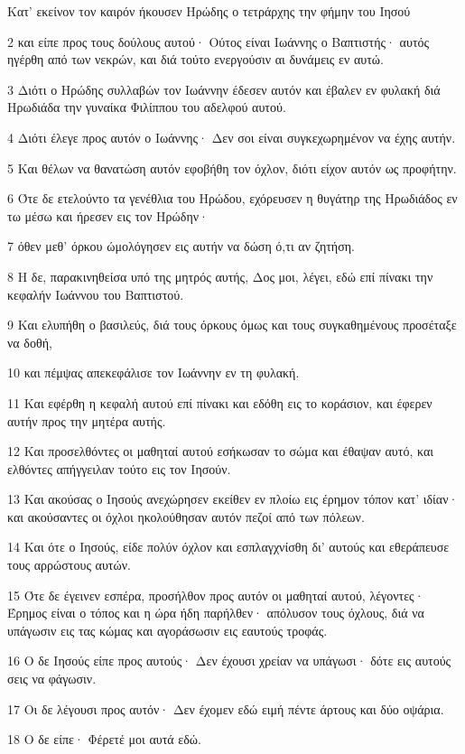\par Κατ' εκείνον τον καιρόν ήκουσεν Ηρώδης ο τετράρχης την φήμην του Ιησού
\par 2 και είπε προς τους δούλους αυτού· Ούτος είναι Ιωάννης ο Βαπτιστής· αυτός ηγέρθη από των νεκρών, και διά τούτο ενεργούσιν αι δυνάμεις εν αυτώ.
\par 3 Διότι ο Ηρώδης συλλαβών τον Ιωάννην έδεσεν αυτόν και έβαλεν εν φυλακή διά Ηρωδιάδα την γυναίκα Φιλίππου του αδελφού αυτού.
\par 4 Διότι έλεγε προς αυτόν ο Ιωάννης· Δεν σοι είναι συγκεχωρημένον να έχης αυτήν.
\par 5 Και θέλων να θανατώση αυτόν εφοβήθη τον όχλον, διότι είχον αυτόν ως προφήτην.
\par 6 Ότε δε ετελούντο τα γενέθλια του Ηρώδου, εχόρευσεν η θυγάτηρ της Ηρωδιάδος εν τω μέσω και ήρεσεν εις τον Ηρώδην·
\par 7 όθεν μεθ' όρκου ώμολόγησεν εις αυτήν να δώση ό,τι αν ζητήση.
\par 8 Η δε, παρακινηθείσα υπό της μητρός αυτής, Δος μοι, λέγει, εδώ επί πίνακι την κεφαλήν Ιωάννου του Βαπτιστού.
\par 9 Και ελυπήθη ο βασιλεύς, διά τους όρκους όμως και τους συγκαθημένους προσέταξε να δοθή,
\par 10 και πέμψας απεκεφάλισε τον Ιωάννην εν τη φυλακή.
\par 11 Και εφέρθη η κεφαλή αυτού επί πίνακι και εδόθη εις το κοράσιον, και έφερεν αυτήν προς την μητέρα αυτής.
\par 12 Και προσελθόντες οι μαθηταί αυτού εσήκωσαν το σώμα και έθαψαν αυτό, και ελθόντες απήγγειλαν τούτο εις τον Ιησούν.
\par 13 Και ακούσας ο Ιησούς ανεχώρησεν εκείθεν εν πλοίω εις έρημον τόπον κατ' ιδίαν· και ακούσαντες οι όχλοι ηκολούθησαν αυτόν πεζοί από των πόλεων.
\par 14 Και ότε ο Ιησούς, είδε πολύν όχλον και εσπλαγχνίσθη δι' αυτούς και εθεράπευσε τους αρρώστους αυτών.
\par 15 Ότε δε έγεινεν εσπέρα, προσήλθον προς αυτόν οι μαθηταί αυτού, λέγοντες· Έρημος είναι ο τόπος και η ώρα ήδη παρήλθεν· απόλυσον τους όχλους, διά να υπάγωσιν εις τας κώμας και αγοράσωσιν εις εαυτούς τροφάς.
\par 16 Ο δε Ιησούς είπε προς αυτούς· Δεν έχουσι χρείαν να υπάγωσι· δότε εις αυτούς σεις να φάγωσιν.
\par 17 Οι δε λέγουσι προς αυτόν· Δεν έχομεν εδώ ειμή πέντε άρτους και δύο οψάρια.
\par 18 Ο δε είπε· Φέρετέ μοι αυτά εδώ.
